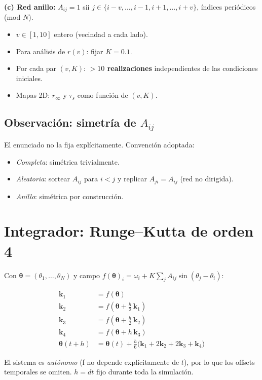 \documentclass[11pt,a4paper]{article}
\begin{document}
\medskip
\textbf{(c) Red anillo:}
$A_{ij}=1$ sii $j \in \{i-v,\ldots,i-1,i+1,\ldots,i+v\}$, índices periódicos (mod $N$).
\begin{itemize}
  \item $v \in [1, 10]$ entero (vecindad a cada lado).
  \item Para análisis de $r(v)$: fijar $K=0.1$.
  \item Por cada par $(v, K)$: \textbf{$>10$ realizaciones} independientes de las condiciones iniciales.
  \item Mapas 2D: $r_\infty$ y $\tau_s$ como función de $(v, K)$.
\end{itemize}

\subsection*{Observación: simetría de $A_{ij}$}

El enunciado no la fija explícitamente. Convención adoptada:
\begin{itemize}
  \item \emph{Completa}: simétrica trivialmente.
  \item \emph{Aleatoria}: sortear $A_{ij}$ para $i<j$ y replicar $A_{ji}=A_{ij}$ (red no dirigida).
  \item \emph{Anillo}: simétrica por construcción.
\end{itemize}

\section{Integrador: Runge--Kutta de orden 4}

Con $\boldsymbol\theta = (\theta_1,\ldots,\theta_N)$ y campo $f(\boldsymbol\theta)_i = \omega_i + K \sum_j A_{ij}\sin(\theta_j-\theta_i)$:

\begin{align*}
\mathbf k_1 &= f(\boldsymbol\theta) \\
\mathbf k_2 &= f(\boldsymbol\theta + \tfrac{h}{2}\,\mathbf k_1) \\
\mathbf k_3 &= f(\boldsymbol\theta + \tfrac{h}{2}\,\mathbf k_2) \\
\mathbf k_4 &= f(\boldsymbol\theta + h\,\mathbf k_3) \\
\boldsymbol\theta(t+h) &= \boldsymbol\theta(t) + \tfrac{h}{6}\bigl(\mathbf k_1 + 2\mathbf k_2 + 2\mathbf k_3 + \mathbf k_4\bigr)
\end{align*}

El sistema es \emph{autónomo} (f no depende explícitamente de $t$), por lo que los offsets temporales se omiten. $h = dt$ fijo durante toda la simulación.
\end{document}
